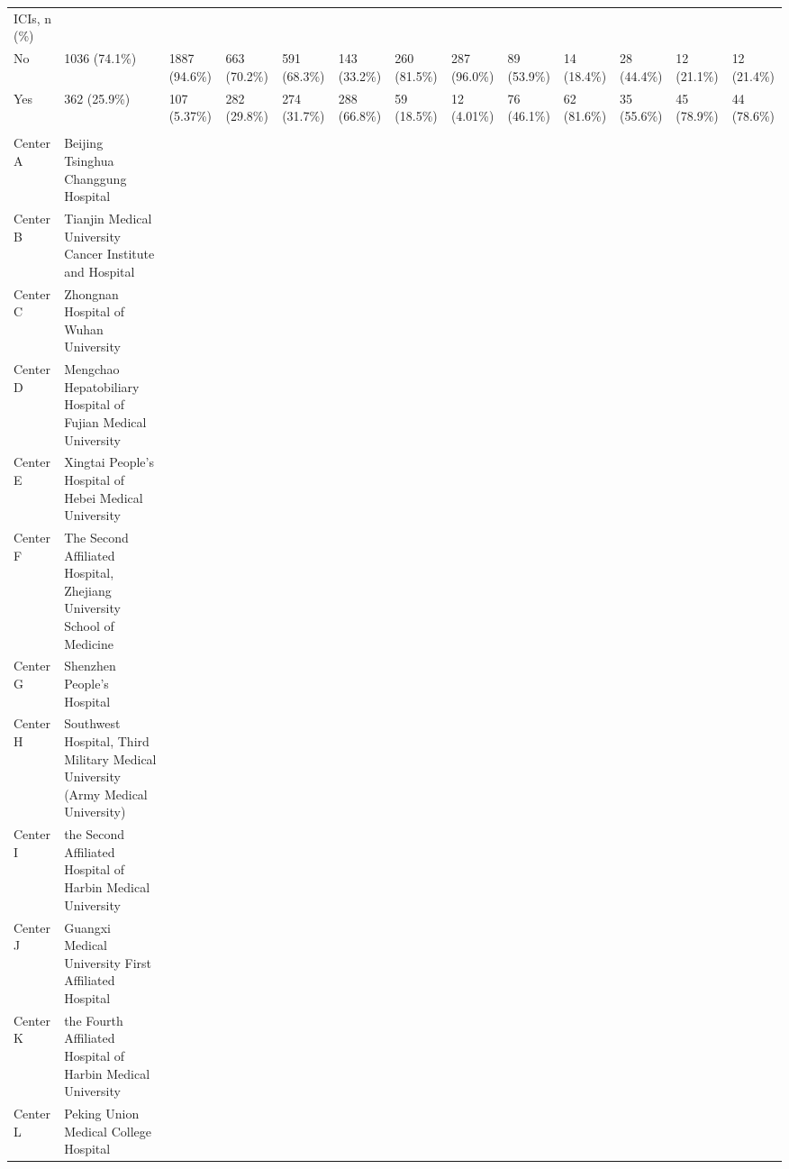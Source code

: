 \begin{landscape}
\begin{center}
\begin{longtable}{p{6.0cm}p{3.0cm}p{3.0cm}p{3.0cm}p{3.0cm}p{3.0cm}p{3.0cm}p{3.0cm}p{3.0cm}p{3.0cm}p{3.0cm}p{3.0cm}p{3.0cm}}
ICIs, n (\%) &                  &                  &                  &                  &                  &                  &                  &                  &                  &                  &                  &                  \\
    No &   1036 (74.1\%)   &   1887 (94.6\%)   &   663 (70.2\%)    &   591 (68.3\%)    &   143 (33.2\%)    &   260 (81.5\%)    &   287 (96.0\%)    &    89 (53.9\%)    &    14 (18.4\%)    &    28 (44.4\%)    &    12 (21.1\%)    &    12 (21.4\%)    \\
    Yes &   362 (25.9\%)    &   107 (5.37\%)    &   282 (29.8\%)    &   274 (31.7\%)    &   288 (66.8\%)    &    59 (18.5\%)    &    12 (4.01\%)    &    76 (46.1\%)    &    62 (81.6\%)    &    35 (55.6\%)    &    45 (78.9\%)    &    44 (78.6\%)    \\
 &  &  &  &  &  &  &  &  &  &  &  &  \\
Center A & Beijing Tsinghua Changgung Hospital &  &  &  &  &  &  &  &  &  &  &  \\
Center B & Tianjin Medical University Cancer Institute and Hospital &  &  &  &  &  &  &  &  &  &  &  \\
Center C & Zhongnan Hospital of Wuhan University &  &  &  &  &  &  &  &  &  &  &  \\
Center D & Mengchao Hepatobiliary Hospital of Fujian Medical University &  &  &  &  &  &  &  &  &  &  &  \\
Center E & Xingtai People's Hospital of Hebei Medical University &  &  &  &  &  &  &  &  &  &  &  \\
Center F & The Second Affiliated Hospital, Zhejiang University School of Medicine &  &  &  &  &  &  &  &  &  &  &  \\
Center G & Shenzhen People's Hospital &  &  &  &  &  &  &  &  &  &  &  \\
Center H & Southwest Hospital, Third Military Medical University (Army Medical University) &  &  &  &  &  &  &  &  &  &  &  \\
Center I & the Second Affiliated Hospital of Harbin Medical University &  &  &  &  &  &  &  &  &  &  &  \\
Center J & Guangxi Medical University First Affiliated Hospital &  &  &  &  &  &  &  &  &  &  &  \\
Center K & the Fourth Affiliated Hospital of Harbin Medical University &  &  &  &  &  &  &  &  &  &  &  \\
Center L & Peking Union Medical College Hospital &  &  &  &  &  &  &  &  &  &  &  \\
\end{longtable}
\end{center}
\end{landscape}


